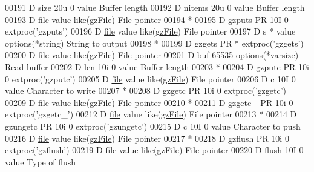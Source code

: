 \begin{DoxyCode}
00191      D  size                         20u 0 value                                Buffer length
00192      D  nitems                       20u 0 value                                Buffer length
00193      D  \hyperlink{structfile}{file}                               value like(\hyperlink{structgz_file__s}{gzFile})                   File pointer
00194       *
00195      D gzputs          PR            10I 0 extproc('gzputs')
00196      D  \hyperlink{structfile}{file}                               value like(\hyperlink{structgz_file__s}{gzFile})                   File pointer
00197      D  s                              *   value options(*\textcolor{keywordtype}{string})               String to output
00198       *
00199      D gzgets          PR              *   extproc('gzgets')
00200      D  \hyperlink{structfile}{file}                               value like(\hyperlink{structgz_file__s}{gzFile})                   File pointer
00201      D  buf                       65535    options(*varsize)                    Read buffer
00202      D  len                          10i 0 value                                Buffer length
00203       *
00204      D gzputc          PR            10i 0 extproc('gzputc')
00205      D  \hyperlink{structfile}{file}                               value like(\hyperlink{structgz_file__s}{gzFile})                   File pointer
00206      D  c                            10I 0 value                                Character to write
00207       *
00208      D gzgetc          PR            10i 0 extproc('gzgetc')
00209      D  \hyperlink{structfile}{file}                               value like(\hyperlink{structgz_file__s}{gzFile})                   File pointer
00210       *
00211      D gzgetc\_         PR            10i 0 extproc('gzgetc\_')
00212      D  \hyperlink{structfile}{file}                               value like(\hyperlink{structgz_file__s}{gzFile})                   File pointer
00213       *
00214      D gzungetc        PR            10i 0 extproc('gzungetc')
00215      D  c                            10I 0 value                                Character to push
00216      D  \hyperlink{structfile}{file}                               value like(\hyperlink{structgz_file__s}{gzFile})                   File pointer
00217       *
00218      D gzflush         PR            10i 0 extproc('gzflush')
00219      D  \hyperlink{structfile}{file}                               value like(\hyperlink{structgz_file__s}{gzFile})                   File pointer
00220      D  flush                        10I 0 value                                Type of flush

\end{DoxyCode}
